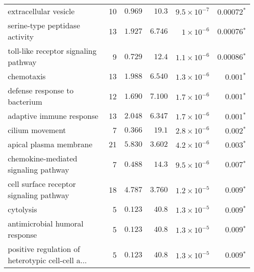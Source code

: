 \documentclass{article}
\begin{document}
\begin{longtable}{|l|r|r|r|r|r|}
                             extracellular vesicle &                      10 &                $ 0.969$ &   $  10.3$ &  $9.5\times 10^{-7}$ &             $\bm{0.00072{^*}}$ \\
                    serine-type peptidase activity &                      13 &                $ 1.927$ &   $ 6.746$ &   $ 1\times 10^{-6}$ &             $\bm{0.00076{^*}}$ \\
              toll-like receptor signaling pathway &                       9 &                $ 0.729$ &   $  12.4$ &  $1.1\times 10^{-6}$ &             $\bm{0.00086{^*}}$ \\
                                        chemotaxis &                      13 &                $ 1.988$ &   $ 6.540$ &  $1.3\times 10^{-6}$ &              $\bm{ 0.001{^*}}$ \\
                     defense response to bacterium &                      12 &                $ 1.690$ &   $ 7.100$ &  $1.7\times 10^{-6}$ &              $\bm{ 0.001{^*}}$ \\
                          adaptive immune response &                      13 &                $ 2.048$ &   $ 6.347$ &  $1.7\times 10^{-6}$ &              $\bm{ 0.001{^*}}$ \\
                                   cilium movement &                       7 &                $ 0.366$ &   $  19.1$ &  $2.8\times 10^{-6}$ &              $\bm{ 0.002{^*}}$ \\
                            apical plasma membrane &                      21 &                $ 5.830$ &   $ 3.602$ &  $4.2\times 10^{-6}$ &              $\bm{ 0.003{^*}}$ \\
              chemokine-mediated signaling pathway &                       7 &                $ 0.488$ &   $  14.3$ &  $9.5\times 10^{-6}$ &              $\bm{ 0.007{^*}}$ \\
           cell surface receptor signaling pathway &                      18 &                $ 4.787$ &   $ 3.760$ &  $1.2\times 10^{-5}$ &              $\bm{ 0.009{^*}}$ \\
                                         cytolysis &                       5 &                $ 0.123$ &   $  40.8$ &  $1.3\times 10^{-5}$ &              $\bm{ 0.009{^*}}$ \\
                    antimicrobial humoral response &                       5 &                $ 0.123$ &   $  40.8$ &  $1.3\times 10^{-5}$ &              $\bm{ 0.009{^*}}$ \\
 positive regulation of heterotypic cell-cell a... &                       5 &                $ 0.123$ &   $  40.8$ &  $1.3\times 10^{-5}$ &              $\bm{ 0.009{^*}}$ \\

\end{longtable}
\end{document}
